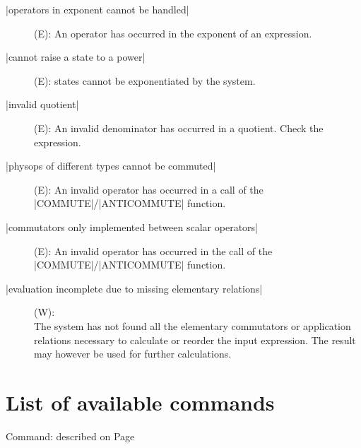 \begin{description}
\item[|operators in exponent cannot be handled|] (E): An operator has
occurred in the exponent of an expression.

\item[|cannot raise a state to a power|] (E): states cannot be
exponentiated by the system.

\item[|invalid quotient|] (E): An invalid denominator has occurred in a
quotient. Check the expression.

\item[|physops of different types cannot be commuted|] (E): An invalid
operator has occurred in a call of the |COMMUTE|/|ANTICOMMUTE| function.

\item[|commutators only implemented between scalar operators|] (E):
An invalid operator has occurred in the call of the
|COMMUTE|/|ANTICOMMUTE| function.

\item[|evaluation incomplete due to missing elementary relations|] (W):
\\
The system has not found all
the elementary commutators or application relations necessary to
calculate or reorder the input expression. The result may however be
used for further calculations.
\end{description}

\section{List of available commands}
\noindent
Command:  \hfill described on Page \\

